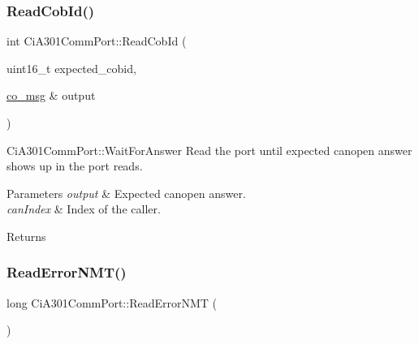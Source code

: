 \mbox{\label{classCiA301CommPort_a408f53d13935a1916ca6f21d08ae135e}} 
\subsubsection{\texorpdfstring{Read\+Cob\+Id()}{ReadCobId()}}
{\footnotesize\ttfamily int Ci\+A301\+Comm\+Port\+::\+Read\+Cob\+Id (\begin{DoxyParamCaption}\item[{uint16\+\_\+t}]{expected\+\_\+cobid,  }\item[{\hyperlink{structco__msg}{co\+\_\+msg} \&}]{output }\end{DoxyParamCaption})\hspace{0.3cm}{\ttfamily [private]}}



Ci\+A301\+Comm\+Port\+::\+Wait\+For\+Answer Read the port until expected canopen answer shows up in the port reads. 


\begin{DoxyParams}{Parameters}
{\em output} & Expected canopen answer. \\
\hline
{\em can\+Index} & Index of the caller. \\
\hline
\end{DoxyParams}
\begin{DoxyReturn}{Returns}

\end{DoxyReturn}
\mbox{\label{classCiA301CommPort_a46534ff9e7e2a05a0b4913e4331710e5}} 
\subsubsection{\texorpdfstring{Read\+Error\+N\+M\+T()}{ReadErrorNMT()}}
{\footnotesize\ttfamily long Ci\+A301\+Comm\+Port\+::\+Read\+Error\+N\+MT (\begin{DoxyParamCaption}{ }\end{DoxyParamCaption})}

\mbox{\label{classCiA301CommPort_a02df85ed5140d0d7a57fe0d2f6e47ea1}} 
